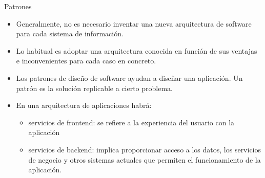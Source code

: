 \documentclass[12pt, twoside, openright]{report} %
\begin{document}
Patrones
\begin{itemize}
	\item Generalmente, no es necesario inventar una
	      nueva arquitectura de software para cada
	      sistema de información.
	\item Lo habitual es adoptar una arquitectura
	      conocida en función de sus ventajas e
	      inconvenientes para cada caso en concreto.
	\item Los patrones de diseño de software ayudan
	      a diseñar una aplicación. Un patrón es la
	      solución replicable a cierto problema.
	\item En una arquitectura de aplicaciones habrá:
	      \begin{itemize}
		      \item servicios de frontend: se refiere a la
		            experiencia del usuario con la aplicación
		      \item servicios de backend: implica
		            proporcionar acceso a los datos, los
		            servicios de negocio y otros sistemas
		            actuales que permiten el funcionamiento
		            de la aplicación.
	      \end{itemize}

\end{itemize}
\end{document}

